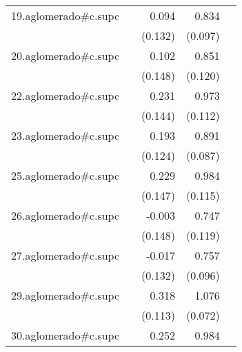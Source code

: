 {\begin{longtable}{l*{4}{D{.}{.}{-1}}}
\addlinespace
19.aglomerado#c.supc&                     &       0.094         &       0.834\sym{***}&                     \\
            &                     &     (0.132)         &     (0.097)         &                     \\
\addlinespace
20.aglomerado#c.supc&                     &       0.102         &       0.851\sym{***}&                     \\
            &                     &     (0.148)         &     (0.120)         &                     \\
\addlinespace
22.aglomerado#c.supc&                     &       0.231         &       0.973\sym{***}&                     \\
            &                     &     (0.144)         &     (0.112)         &                     \\
\addlinespace
23.aglomerado#c.supc&                     &       0.193         &       0.891\sym{***}&                     \\
            &                     &     (0.124)         &     (0.087)         &                     \\
\addlinespace
25.aglomerado#c.supc&                     &       0.229         &       0.984\sym{***}&                     \\
            &                     &     (0.147)         &     (0.115)         &                     \\
\addlinespace
26.aglomerado#c.supc&                     &      -0.003         &       0.747\sym{***}&                     \\
            &                     &     (0.148)         &     (0.119)         &                     \\
\addlinespace
27.aglomerado#c.supc&                     &      -0.017         &       0.757\sym{***}&                     \\
            &                     &     (0.132)         &     (0.096)         &                     \\
\addlinespace
29.aglomerado#c.supc&                     &       0.318\sym{**} &       1.076\sym{***}&                     \\
            &                     &     (0.113)         &     (0.072)         &                     \\
\addlinespace
30.aglomerado#c.supc&                     &       0.252         &       0.984\sym{***}&                     \\

\end{longtable}}
